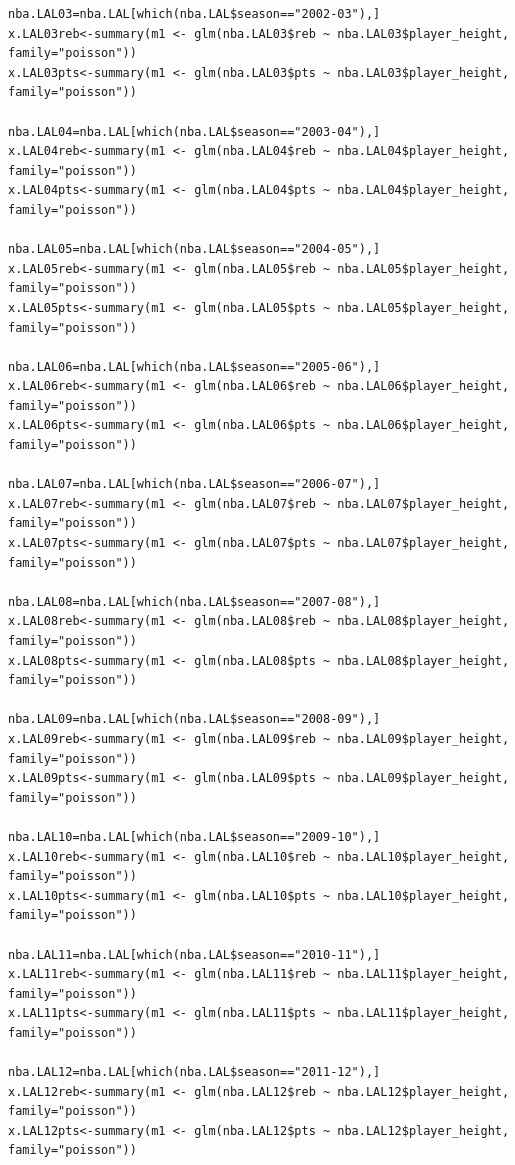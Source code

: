 \documentclass[11pt,letterpaper]{amsart}
\begin{document}
\begin{lstlisting}[breaklines]
nba.LAL03=nba.LAL[which(nba.LAL$season=="2002-03"),]
x.LAL03reb<-summary(m1 <- glm(nba.LAL03$reb ~ nba.LAL03$player_height, family="poisson"))
x.LAL03pts<-summary(m1 <- glm(nba.LAL03$pts ~ nba.LAL03$player_height, family="poisson"))

nba.LAL04=nba.LAL[which(nba.LAL$season=="2003-04"),]
x.LAL04reb<-summary(m1 <- glm(nba.LAL04$reb ~ nba.LAL04$player_height, family="poisson"))
x.LAL04pts<-summary(m1 <- glm(nba.LAL04$pts ~ nba.LAL04$player_height, family="poisson"))

nba.LAL05=nba.LAL[which(nba.LAL$season=="2004-05"),]
x.LAL05reb<-summary(m1 <- glm(nba.LAL05$reb ~ nba.LAL05$player_height, family="poisson"))
x.LAL05pts<-summary(m1 <- glm(nba.LAL05$pts ~ nba.LAL05$player_height, family="poisson"))

nba.LAL06=nba.LAL[which(nba.LAL$season=="2005-06"),]
x.LAL06reb<-summary(m1 <- glm(nba.LAL06$reb ~ nba.LAL06$player_height, family="poisson"))
x.LAL06pts<-summary(m1 <- glm(nba.LAL06$pts ~ nba.LAL06$player_height, family="poisson"))

nba.LAL07=nba.LAL[which(nba.LAL$season=="2006-07"),]
x.LAL07reb<-summary(m1 <- glm(nba.LAL07$reb ~ nba.LAL07$player_height, family="poisson"))
x.LAL07pts<-summary(m1 <- glm(nba.LAL07$pts ~ nba.LAL07$player_height, family="poisson"))

nba.LAL08=nba.LAL[which(nba.LAL$season=="2007-08"),]
x.LAL08reb<-summary(m1 <- glm(nba.LAL08$reb ~ nba.LAL08$player_height, family="poisson"))
x.LAL08pts<-summary(m1 <- glm(nba.LAL08$pts ~ nba.LAL08$player_height, family="poisson"))

nba.LAL09=nba.LAL[which(nba.LAL$season=="2008-09"),]
x.LAL09reb<-summary(m1 <- glm(nba.LAL09$reb ~ nba.LAL09$player_height, family="poisson"))
x.LAL09pts<-summary(m1 <- glm(nba.LAL09$pts ~ nba.LAL09$player_height, family="poisson"))

nba.LAL10=nba.LAL[which(nba.LAL$season=="2009-10"),]
x.LAL10reb<-summary(m1 <- glm(nba.LAL10$reb ~ nba.LAL10$player_height, family="poisson"))
x.LAL10pts<-summary(m1 <- glm(nba.LAL10$pts ~ nba.LAL10$player_height, family="poisson"))

nba.LAL11=nba.LAL[which(nba.LAL$season=="2010-11"),]
x.LAL11reb<-summary(m1 <- glm(nba.LAL11$reb ~ nba.LAL11$player_height, family="poisson"))
x.LAL11pts<-summary(m1 <- glm(nba.LAL11$pts ~ nba.LAL11$player_height, family="poisson"))

nba.LAL12=nba.LAL[which(nba.LAL$season=="2011-12"),]
x.LAL12reb<-summary(m1 <- glm(nba.LAL12$reb ~ nba.LAL12$player_height, family="poisson"))
x.LAL12pts<-summary(m1 <- glm(nba.LAL12$pts ~ nba.LAL12$player_height, family="poisson"))


\end{lstlisting}
\end{document}
